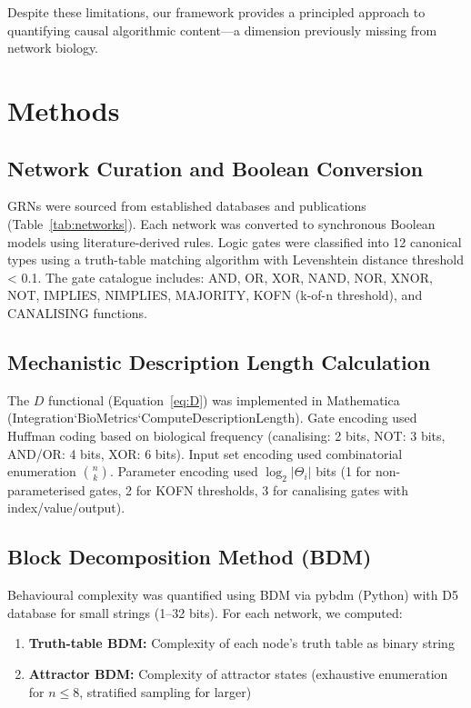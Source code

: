 \documentclass[12pt]{article}
\begin{document}
Despite these limitations, our framework provides a principled approach to quantifying causal algorithmic content—a dimension previously missing from network biology.

\section{Methods}

\subsection{Network Curation and Boolean Conversion}
GRNs were sourced from established databases and publications (Table~\ref{tab:networks}). Each network was converted to synchronous Boolean models using literature-derived rules. Logic gates were classified into 12 canonical types using a truth-table matching algorithm with Levenshtein distance threshold < 0.1. The gate catalogue includes: AND, OR, XOR, NAND, NOR, XNOR, NOT, IMPLIES, NIMPLIES, MAJORITY, KOFN (k-of-n threshold), and CANALISING functions.

\subsection{Mechanistic Description Length Calculation}
The \(D\) functional (Equation~\ref{eq:D}) was implemented in Mathematica (Integration`BioMetrics`ComputeDescriptionLength). Gate encoding used Huffman coding based on biological frequency (canalising: 2 bits, NOT: 3 bits, AND/OR: 4 bits, XOR: 6 bits). Input set encoding used combinatorial enumeration \(\binom{n}{k}\). Parameter encoding used \(\log_2 |\Theta_i|\) bits (1 for non-parameterised gates, 2 for KOFN thresholds, 3 for canalising gates with index/value/output).

\subsection{Block Decomposition Method (BDM)}
Behavioural complexity was quantified using BDM via pybdm (Python) with D5 database for small strings (1–32 bits). For each network, we computed:
\begin{enumerate}
    \item \textbf{Truth-table BDM:} Complexity of each node's truth table as binary string
    \item \textbf{Attractor BDM:} Complexity of attractor states (exhaustive enumeration for \(n \leq 8\), stratified sampling for larger)
\end{enumerate}
\end{document}
